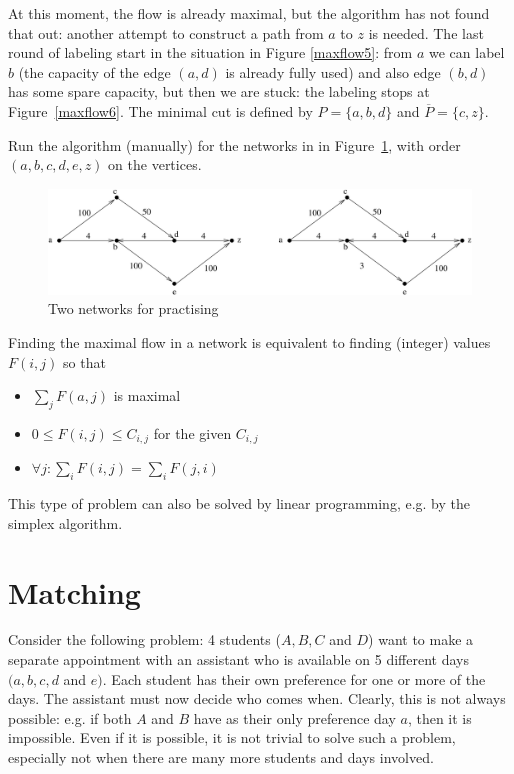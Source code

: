 At this moment, the flow is already maximal, but the algorithm has not
found that out: another attempt to construct a path from $a$ to $z$ is
needed. The last round of labeling start in the situation in Figure
\ref{maxflow5}: from $a$ we can label $b$ (the capacity of the edge
$(a,d)$ is already fully used) and also edge $(b,d)$ has some spare
capacity, but then we are stuck: the labeling stops at
Figure~\ref{maxflow6}. The minimal cut is defined by $P = \{a,b,d\}$ and
$\overline{P} = \{c,z\}$.

Run the algorithm (manually) for the networks in in
Figure~\ref{maxflow7}, with order $(a,b,c,d,e,z)$ on the vertices.

\begin{figure}[ht]
\begin{center}
\includegraphics[width=0.6\linewidth,keepaspectratio]{maxflow7} %
\end{center}
\caption{Two networks for practising \label{maxflow7}}
\end{figure}

Finding the maximal flow in a network is equivalent to finding
(integer) values $F(i,j)$ so that
\begin{itemize}
\item
$\sum_{j} F(a,j)$ is maximal
\item
$0 \leq F(i,j) \leq C_{i,j}$ for the given $C_{i,j}$
\item
$\forall j: \sum_{i} F(i,j) = \sum_{i} F(j,i)$
\end{itemize}

This type of problem can also be solved by linear programming,
e.g. by the simplex algorithm.

\section{Matching}

Consider the following problem: 4 students ($A,B,C$ and $D$) want to
make a separate appointment with an assistant who is available on 5
different days $(a,b,c,d$ and $e)$. Each student has their own
preference for one or more of the days. The assistant must now decide
who comes when.  Clearly, this is not always possible: e.g. if both
$A$ and $B$ have as their only preference day $a$, then it is
impossible. Even if it is possible, it is not trivial to solve such a
problem, especially not when there are many more students and days
involved.

